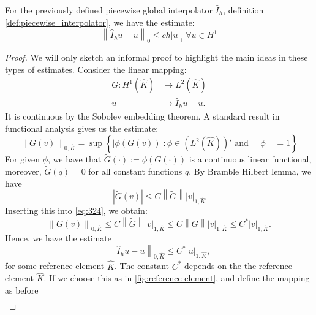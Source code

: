 \begin{lemma}\label{lemma:int_error}
	For the previously defined piecewise global interpolator $\hat{I}_h$, definition \ref{def:piecewise_interpolator}, we have the estimate:
	\begin{equation}
		\left \| \hat{I}_h u - u \right \|_0 \leq c h | u |_1 \ \forall u \in H^1
	\end{equation}
\end{lemma}
\begin{proof}
	We will only sketch an informal proof to highlight the main ideas in these types of estimates. 
	Consider the linear mapping:
	\begin{equation}\label{eq:324}
		\begin{aligned}
			G: H^1(\hat{K})&\rightarrow L^2(\hat{K}) \\
			u &\mapsto \hat{I}_h u - u.
		\end{aligned}
	\end{equation}
	It is continuous by the Sobolev embedding theorem.
	A standard result in functional analysis gives us the estimate:
	\begin{equation}
		\left \| G(v) \right \|_{0,\hat{K}} = \sup \left \{ |\phi (G(v)) |: \phi \in (L^2(\hat{K}))' \text{ and } \left \|\phi \right \|=1 \right \}
	\end{equation}
	For given $\phi$, we have that $\tilde{G}(\cdot) :=\phi(G(\cdot))$ is a continuous linear functional, moreover, $\tilde{G}(q)=0$ for all constant functions $q$. By Bramble Hilbert lemma, we have 
	\begin{equation}
		|\tilde{G}(v)|\leq C \left \| \tilde{G} \right \| |v|_{1,\hat{K}}
	\end{equation}
	Inserting this into \eqref{eq:324}, we obtain:
	\begin{equation}
		\left \| G(v) \right \|_{0,\hat{K}} \leq C \left \| \tilde{G} \right \|  |v|_{1,\hat{K}} \leq C \left \| G \right \| |v|_{1,\hat{K}} \leq C^*|v|_{1,\hat{K}}.
	\end{equation}
	Hence, we have the estimate
	\begin{equation}\label{eq:bramble}
		\left \| \hat{I}_h u - u \right \|_{0,\hat{K}} \leq C^* |u|_{1,\hat{K}},
	\end{equation}
	for some reference element $\hat{K}$. The constant $C^*$ depends on the the reference element $\hat{K}$. If we choose this as in \ref{fig:reference element}, and define the mapping as before 
	\begin{equation}
		\begin{aligned}

\end{aligned}
\end{equation}
\end{proof}
